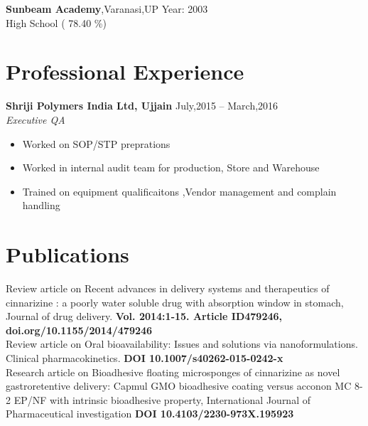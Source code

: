\documentclass[margin,line]{res}
\begin{document}
\begin{resume}
{\bf Sunbeam Academy},Varanasi,UP \hfill Year: 2003 \\
High School \hfill( 78.40 \%)
\\




\section{\sc Professional Experience}

{\bf Shriji Polymers India Ltd, Ujjain}                 \hfill{July,2015 -- March,2016}\\
{\em Executive QA} \hfill \\

\begin{itemize} 
\setlength\itemsep{-1em}

\item Worked on SOP/STP preprations\\
\item Worked in internal audit team for production, Store and Warehouse\\
\item Trained on equipment qualificaitons ,Vendor management and complain handling\\

\end{itemize}





\section{\sc Publications}


Review article on Recent advances in delivery systems and therapeutics of cinnarizine : a poorly water soluble drug with absorption window in stomach, Journal of drug delivery. { \bf Vol. 2014:1-15. Article ID479246, doi.org/10.1155/2014/479246} \vspace{1.5mm}\\
Review article on Oral bioavailability: Issues and solutions via nanoformulations. Clinical pharmacokinetics. { \bf DOI 10.1007/s40262-015-0242-x} \vspace{1.5mm}\\
Research article on Bioadhesive floating microsponges of cinnarizine as novel gastroretentive delivery: Capmul GMO bioadhesive coating versus acconon MC 8-2 EP/NF with intrinsic bioadhesive property, International Journal of Pharmaceutical investigation {\bf  DOI 10.4103/2230-973X.195923} \vspace{1.5mm}






\end{resume}
\end{document}
